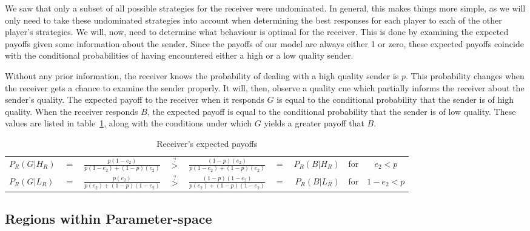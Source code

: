 \documentclass[a4paper,12pt]{article}
\numberwithin{equation}{section}
\begin{document}
We saw that only a subset of all possible strategies for the receiver were undominated. In general, this makes things more simple, as we will only need to take these undominated strategies into account when determining the best responses for each player to each of the other player's strategies. We will, now, need to determine what behaviour is optimal for the receiver. This is done by examining the expected payoffs given some information about the sender. Since the payoffs of our model are always either 1 or zero, these expected payoffs coincide with the conditional probabilities of having encountered either a high or a low quality sender.

Without any prior information, the receiver knows the probability of dealing with a high quality sender is $p$. This probability changes when the receiver gets a chance to examine the sender properly. It will, then, observe a quality cue which partially informs the receiver about the sender's quality. The expected payoff to the receiver when it responds $G$ is equal to the conditional probability that the sender is of high quality. When the receiver responds $B$, the expected payoff is equal to the conditional probability that the sender is of low quality. These values are listed in table~\ref{tab:BasicCueGame/ConditionalPayoffsR}, along with the conditions under which $G$ yields a greater payoff that $B$.

\begin{table}[h]
\begin{center}
\setlength{\tabcolsep}{.45em}
\begin{tabular}{lcccccrcc}
$P_{R}(G|H_{R})$ & $=$ & $\frac{p(1-e_{2})}{p(1-e_{2})+(1-p)(e_{2})}$ & $\stackrel{?}{>}$ & $\frac{(1-p)(e_{2})}{p(1-e_{2})+(1-p)(e_{2})}$ & $=$ & $P_{R}(B|H_{R})$ & for & $e_{2}<p$\\
$P_{R}(G|L_{R})$ & $=$ & $\frac{p(e_{2})}{p(e_{2})+(1-p)(1-e_{2})}$ & $\stackrel{?}{>}$ & $\frac{(1-p)(1-e_{2})}{p(e_{2})+(1-p)(1-e_{2})}$ & $=$ & $P_{R}(B|L_{R})$ & for & $1-e_{2}<p$
\end{tabular}
\end{center}
\caption{Receiver's expected payoffs}
\label{tab:BasicCueGame/ConditionalPayoffsR}
\end{table}


\subsection{Regions within Parameter-space}
\label{sec:Basic Cue Game/Regions}
\end{document}
